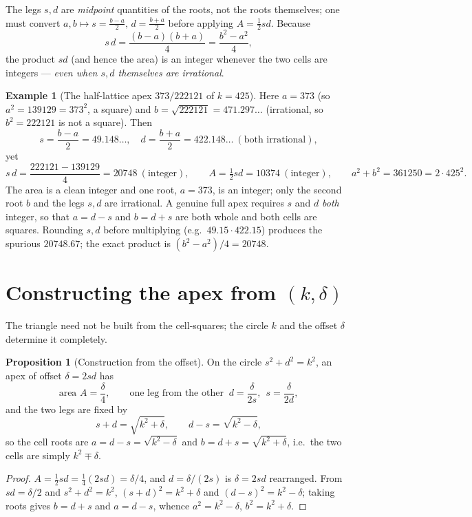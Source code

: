\documentclass[11pt]{article}
\theoremstyle{definition}
\newtheorem{proposition}{Proposition}
\newtheorem{example}{Example}
\begin{document}
\noindent The legs $s,d$ are \emph{midpoint} quantities of the roots, not the
roots themselves; one must convert $a,b\mapsto s=\tfrac{b-a}{2},\,d=\tfrac{b+a}{2}$
before applying $A=\tfrac12 sd$. Because
\[
  s\,d=\frac{(b-a)(b+a)}{4}=\frac{b^{2}-a^{2}}{4},
\]
the product $sd$ (and hence the area) is an integer whenever the two cells are
integers --- \emph{even when $s,d$ themselves are irrational}.

\begin{example}[The half-lattice apex $373/222121$ of $k=425$]
Here $a=373$ (so $a^{2}=139129=373^{2}$, a square) and $b=\sqrt{222121}=471.297\ldots$
(irrational, so $b^{2}=222121$ is not a square). Then
\[
  s=\frac{b-a}{2}=49.148\ldots,\quad d=\frac{b+a}{2}=422.148\ldots\ (\text{both irrational}),
\]
yet
\[
  s\,d=\frac{222121-139129}{4}=20748\ (\text{integer}),\qquad
  A=\tfrac12 sd=10374\ (\text{integer}),\qquad
  a^{2}+b^{2}=361250=2\cdot425^{2}.
\]
The area is a clean integer and one root, $a=373$, is an integer; only the second
root $b$ and the legs $s,d$ are irrational. A genuine full apex requires $s$ and
$d$ \emph{both} integer, so that $a=d-s$ and $b=d+s$ are both whole and both cells
are squares. Rounding $s,d$ before multiplying (e.g.\ $49.15\cdot422.15$) produces
the spurious $20748.67$; the exact product is $(b^{2}-a^{2})/4=20748$.
\end{example}

\section{Constructing the apex from $(k,\delta)$}

The triangle need not be built from the cell-squares; the circle $k$ and the
offset $\delta$ determine it completely.

\begin{proposition}[Construction from the offset]\label{prop:construct}
On the circle $s^{2}+d^{2}=k^{2}$, an apex of offset $\delta=2sd$ has
\[
  \text{area } A=\frac{\delta}{4},\qquad
  \text{one leg from the other } \ d=\frac{\delta}{2s},\ \ s=\frac{\delta}{2d},
\]
and the two legs are fixed by
\[
  s+d=\sqrt{k^{2}+\delta},\qquad d-s=\sqrt{k^{2}-\delta},
\]
so the cell roots are $a=d-s=\sqrt{k^{2}-\delta}$ and $b=d+s=\sqrt{k^{2}+\delta}$,
i.e.\ the two cells are simply $k^{2}\mp\delta$.
\end{proposition}

\begin{proof}
$A=\tfrac12 sd=\tfrac14(2sd)=\delta/4$, and $d=\delta/(2s)$ is $\delta=2sd$
rearranged. From $sd=\delta/2$ and $s^{2}+d^{2}=k^{2}$,
$(s+d)^{2}=k^{2}+\delta$ and $(d-s)^{2}=k^{2}-\delta$; taking roots gives $b=d+s$
and $a=d-s$, whence $a^{2}=k^{2}-\delta$, $b^{2}=k^{2}+\delta$.
\end{proof}
\end{document}
